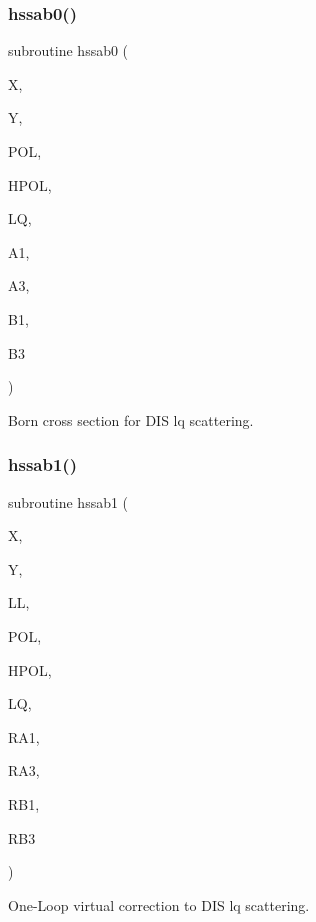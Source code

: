 \subsubsection{\texorpdfstring{hssab0()}{hssab0()}}
{\footnotesize\ttfamily subroutine hssab0 (\begin{DoxyParamCaption}\item[{}]{X,  }\item[{}]{Y,  }\item[{}]{P\+OL,  }\item[{}]{H\+P\+OL,  }\item[{}]{LQ,  }\item[{}]{A1,  }\item[{}]{A3,  }\item[{}]{B1,  }\item[{}]{B3 }\end{DoxyParamCaption})}



Born cross section for D\+IS lq scattering. 

\mbox{\label{djangoh__h_8f_ae79d168be183460bb3a8f1ba4f6f983c}} 
\subsubsection{\texorpdfstring{hssab1()}{hssab1()}}
{\footnotesize\ttfamily subroutine hssab1 (\begin{DoxyParamCaption}\item[{}]{X,  }\item[{}]{Y,  }\item[{}]{LL,  }\item[{}]{P\+OL,  }\item[{}]{H\+P\+OL,  }\item[{}]{LQ,  }\item[{}]{R\+A1,  }\item[{}]{R\+A3,  }\item[{}]{R\+B1,  }\item[{}]{R\+B3 }\end{DoxyParamCaption})}



One-\/\+Loop virtual correction to D\+IS lq scattering. 

\mbox{\label{djangoh__h_8f_a56a21f2f4c8f198faf695976bb121eb2}} 
